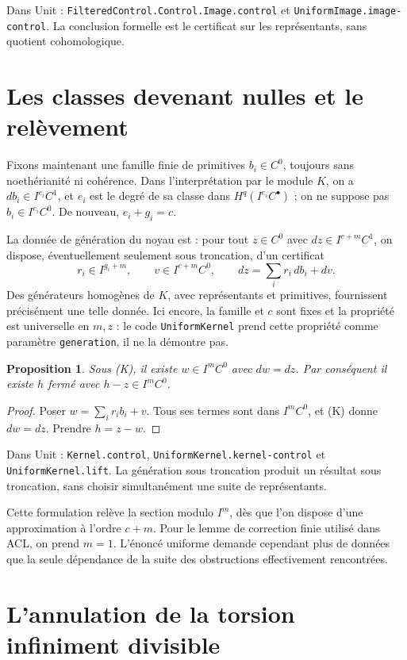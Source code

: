 \documentclass[11pt]{amsart}
\newtheorem{proposition}{Proposition}
\begin{document}
Dans Unit : \texttt{FilteredControl.Control.Image.control} et
\texttt{UniformImage.image-control}. La conclusion formelle est
le certificat sur les représentants, sans quotient cohomologique.

\section{Les classes devenant nulles et le relèvement}

Fixons maintenant une famille finie de primitives $b_i\in C^0$,
toujours sans noethérianité ni cohérence.
Dans l'interprétation par le module $K$, on a $db_i\in I^{e_i}C^1$,
et $e_i$ est le degré de sa classe dans $H^q(I^{e_i}C^\bullet)$ ;
on ne suppose pas $b_i\in I^{e_i}C^0$.
De nouveau, $e_i+g_i=c$.

La donnée de génération du noyau est : pour tout $z\in C^0$ avec
$dz\in I^{c+m}C^1$, on dispose, éventuellement seulement sous
troncation, d'un certificat
\[
 r_i\in I^{g_i+m},\qquad v\in I^{c+m}C^0,
 \qquad dz=\sum_i r_i\,db_i+dv.              \tag{K}
\]
Des générateurs homogènes de $K$, avec représentants et primitives,
fournissent précisément une telle donnée.
Ici encore, la famille et $c$ sont fixes et la propriété est universelle
en $m,z$ : le code \texttt{UniformKernel} prend cette propriété comme
paramètre \texttt{generation}, il ne la démontre pas.

\begin{proposition}
Sous \textup{(K)}, il existe $w\in I^mC^0$ avec $dw=dz$.
Par conséquent il existe $h$ fermé avec $h-z\in I^mC^0$.
\end{proposition}
\begin{proof}
Poser $w=\sum_i r_i b_i+v$. Tous ses termes sont dans $I^mC^0$,
et (K) donne $dw=dz$. Prendre $h=z-w$.
\end{proof}

Dans Unit : \texttt{Kernel.control}, \texttt{UniformKernel.kernel-control}
et \texttt{UniformKernel.lift}. La génération sous troncation produit
un résultat sous troncation, sans choisir simultanément une suite de
représentants.

Cette formulation relève la section modulo $I^m$, dès que l'on
dispose d'une approximation à l'ordre $c+m$. Pour le lemme de correction
finie utilisé dans ACL, on prend $m=1$. L'énoncé uniforme demande
cependant plus de données que la seule dépendance de la suite des
obstructions effectivement rencontrées.

\section{L'annulation de la torsion infiniment divisible}
\end{document}
